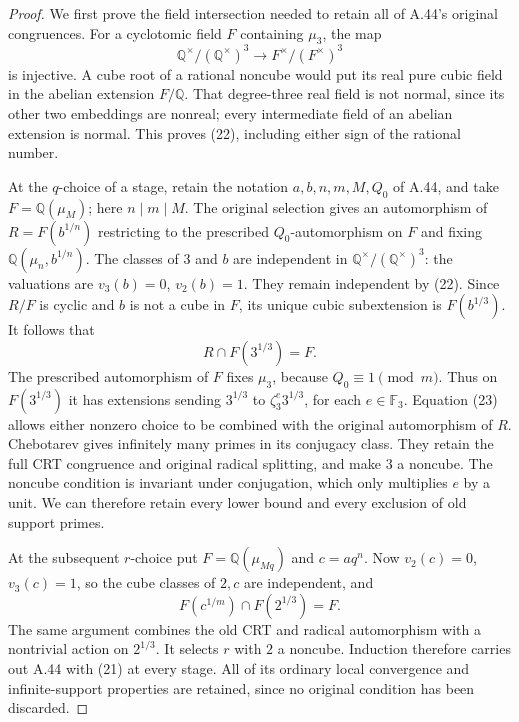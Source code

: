 \begin{proof}
We first prove the field intersection needed to retain all
of A.44's original congruences. For a cyclotomic field
\(F\) containing \(\mu_3\), the map
\[
 \mathbb Q^\times/(\mathbb Q^\times)^3
       \longrightarrow F^\times/(F^\times)^3
                                                        \tag{22}
\]
is injective. A cube root of a rational noncube would put
its real pure cubic field in the abelian extension
\(F/\mathbb Q\). That degree-three real field is not
normal, since its other two embeddings are nonreal;
every intermediate field of an abelian extension is
normal. This proves (22), including either sign of the
rational number.

At the \(q\)-choice of a stage, retain the notation
\(a,b,n,m,M,Q_0\) of A.44, and take
\(F=\mathbb Q(\mu_M)\); here \(n\mid m\mid M\).
The original selection gives an automorphism of
\(R=F(b^{1/n})\) restricting to the prescribed
\(Q_0\)-automorphism on \(F\) and fixing
\(\mathbb Q(\mu_n,b^{1/n})\).
The classes of \(3\) and \(b\) are independent in
\(\mathbb Q^\times/(\mathbb Q^\times)^3\): the
valuations are \(v_3(b)=0\), \(v_2(b)=1\).
They remain independent by (22). Since \(R/F\)
is cyclic and \(b\) is not a cube in \(F\), its
unique cubic subextension is \(F(b^{1/3})\).
It follows that
\[
                 R\cap F(3^{1/3})=F.                 \tag{23}
\]
The prescribed automorphism of \(F\) fixes \(\mu_3\),
because \(Q_0\equiv1\pmod m\). Thus on
\(F(3^{1/3})\) it has extensions sending
\(3^{1/3}\) to \(\zeta_3^e3^{1/3}\),
for each \(e\in\mathbb F_3\). Equation (23)
allows either nonzero choice to be combined with the
original automorphism of \(R\). Chebotarev
\cite[Theorem 8.31]{GhostMilneANT} gives infinitely
many primes in its conjugacy class. They retain the
full CRT congruence and original radical splitting,
and make \(3\) a noncube. The noncube condition is
invariant under conjugation, which only multiplies
\(e\) by a unit. We can therefore retain every
lower bound and every exclusion of old support primes.

At the subsequent \(r\)-choice put
\(F=\mathbb Q(\mu_{Mq})\) and \(c=aq^n\).
Now \(v_2(c)=0\), \(v_3(c)=1\), so the cube
classes of \(2,c\) are independent, and
\[
        F(c^{1/m})\cap F(2^{1/3})=F.
\]
The same argument combines the old CRT and radical
automorphism with a nontrivial action on \(2^{1/3}\).
It selects \(r\) with \(2\) a noncube. Induction
therefore carries out A.44 with (21) at every stage.
All of its ordinary local convergence and infinite-support
properties are retained, since no original condition has
been discarded.


\end{proof}
